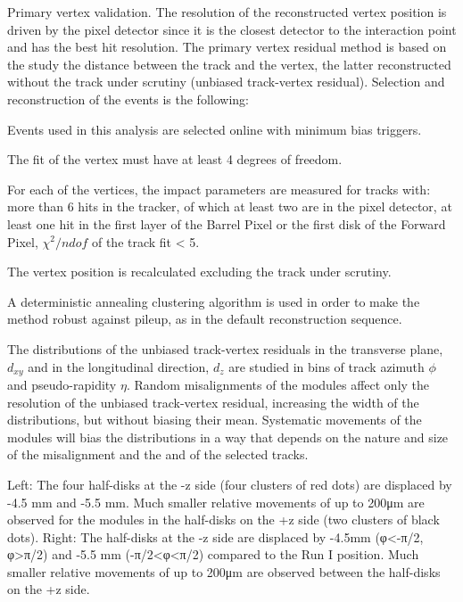 Primary vertex validation. The resolution of the reconstructed vertex position is driven by the pixel detector since it is the closest detector to the interaction point and has the best hit resolution. The primary vertex residual method is based on the study the distance between the track and the vertex, the latter reconstructed without the track under scrutiny (unbiased track-vertex residual). Selection and reconstruction of the events is the following:

    Events used in this analysis are selected online with minimum bias triggers.

    The fit of the vertex must have at least 4 degrees of freedom.

    For each of the vertices, the impact parameters are measured for tracks with:
        more than 6 hits in the tracker, of which at least two are in the pixel detector,
        at least one hit in the first layer of the Barrel Pixel or the first disk of the Forward Pixel,
        $\chi^{2}/ndof$ of the track fit < 5. 

    The vertex position is recalculated excluding the track under scrutiny.

    A deterministic annealing clustering algorithm is used in order to make the method robust against pileup, as in the default reconstruction sequence. 

The distributions of the unbiased track-vertex residuals in the transverse plane, $d_{xy}$ and in the longitudinal direction, $d_{z}$ are studied in bins of track azimuth $\phi$ and pseudo-rapidity $\eta$. Random misalignments of the modules affect only the resolution of the unbiased track-vertex residual, increasing the width of the distributions, but without biasing their mean. Systematic movements of the modules will bias the distributions in a way that depends on the nature and size of the misalignment and the and of the selected tracks. 

Left: The four half-disks at the -z side (four clusters of red dots) are displaced by -4.5 mm and -5.5 mm. Much smaller relative movements of up to 200μm are observed for the modules in the half-disks on the +z side (two clusters of black dots). Right: The half-disks at the -z side are displaced by -4.5mm (φ<-π/2, φ>π/2) and -5.5 mm (-π/2<φ<π/2) compared to the Run I position. Much smaller relative movements of up to 200μm are observed between the half-disks on the +z side.

